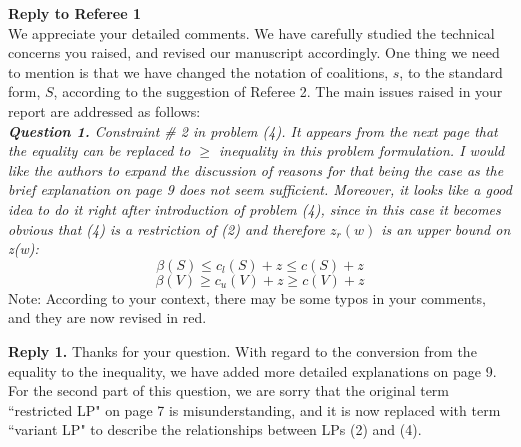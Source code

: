 \documentclass[11pt]{article}
\begin{document}
\noindent \textbf{\large Reply to Referee 1}
\\[3mm]
We appreciate your detailed comments.
We have carefully studied the technical concerns you raised, and revised our manuscript accordingly.
One thing we need to mention is that we have changed the notation of coalitions, $s$, to the standard form, $S$, according to the suggestion of  Referee 2.
The main issues raised in your report are addressed as follows:
\\[4mm]
%
%
\noindent \textit{\textbf{Question 1.}
Constraint \# 2 in problem (4). It appears from the next page that the equality can be replaced to $\geq$ inequality in this problem formulation. I would like the authors to expand the discussion of reasons for that being the case as the brief explanation on page 9 does not seem sufficient. Moreover, it looks like a good idea to do it right after introduction of problem (4), since in this case it becomes obvious that (4) is a restriction of (2) and therefore $z_r(w)$ is an upper bound on z(w):}
$$\beta(S) \leq c_l(S) + z \leq c(S) + z$$
$$\beta(V) \geq c_u(V) + z \geq c(V) + z$$
{\small Note: According to your context, there may be some typos in your comments, and they are now revised in red.}

\noindent \textbf{Reply 1.}
Thanks for your question. With regard to the conversion from the equality to the inequality, we have added more detailed explanations on page 9. For the second part of this question, we are sorry that the original term ``restricted LP" on page 7 is misunderstanding, and it is now replaced with term ``variant LP" to describe the relationships between LPs (2) and (4).
\end{document}
